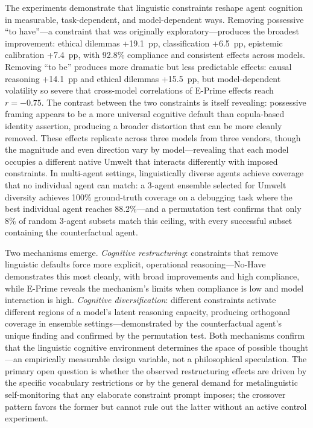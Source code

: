 \documentclass[11pt,a4paper]{article}
\begin{document}
The experiments demonstrate that linguistic constraints reshape agent cognition in measurable, task-dependent, and model-dependent ways. Removing possessive ``to have''---a constraint that was originally exploratory---produces the broadest improvement: ethical dilemmas +19.1~pp, classification +6.5~pp, epistemic calibration +7.4~pp, with 92.8\% compliance and consistent effects across models. Removing ``to be'' produces more dramatic but less predictable effects: causal reasoning +14.1~pp and ethical dilemmas +15.5~pp, but model-dependent volatility so severe that cross-model correlations of E-Prime effects reach $r = -0.75$. The contrast between the two constraints is itself revealing: possessive framing appears to be a more universal cognitive default than copula-based identity assertion, producing a broader distortion that can be more cleanly removed. These effects replicate across three models from three vendors, though the magnitude and even direction vary by model---revealing that each model occupies a different native Umwelt that interacts differently with imposed constraints. In multi-agent settings, linguistically diverse agents achieve coverage that no individual agent can match: a 3-agent ensemble selected for Umwelt diversity achieves 100\% ground-truth coverage on a debugging task where the best individual agent reaches 88.2\%---and a permutation test confirms that only 8\% of random 3-agent subsets match this ceiling, with every successful subset containing the counterfactual agent.

Two mechanisms emerge. \emph{Cognitive restructuring}: constraints that remove linguistic defaults force more explicit, operational reasoning---No-Have demonstrates this most cleanly, with broad improvements and high compliance, while E-Prime reveals the mechanism's limits when compliance is low and model interaction is high. \emph{Cognitive diversification}: different constraints activate different regions of a model's latent reasoning capacity, producing orthogonal coverage in ensemble settings---demonstrated by the counterfactual agent's unique finding and confirmed by the permutation test. Both mechanisms confirm that the linguistic cognitive environment determines the space of possible thought---an empirically measurable design variable, not a philosophical speculation. The primary open question is whether the observed restructuring effects are driven by the specific vocabulary restrictions or by the general demand for metalinguistic self-monitoring that any elaborate constraint prompt imposes; the crossover pattern favors the former but cannot rule out the latter without an active control experiment.
\end{document}
